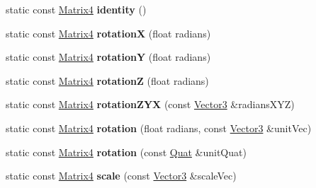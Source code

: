 \begin{DoxyCompactItemize}
static const \hyperlink{classVectormath_1_1Aos_1_1Matrix4}{Matrix4} {\bfseries identity} ()
\item 
\mbox{\label{classVectormath_1_1Aos_1_1Matrix4_a5727665fe6a8f581e578c9ca268da7f1}} 
static const \hyperlink{classVectormath_1_1Aos_1_1Matrix4}{Matrix4} {\bfseries rotationX} (float radians)
\item 
\mbox{\label{classVectormath_1_1Aos_1_1Matrix4_a083cd75aa544d7760d85a989da2d1211}} 
static const \hyperlink{classVectormath_1_1Aos_1_1Matrix4}{Matrix4} {\bfseries rotationY} (float radians)
\item 
\mbox{\label{classVectormath_1_1Aos_1_1Matrix4_a1f6d2e00f90838b9c79616f0ef13de66}} 
static const \hyperlink{classVectormath_1_1Aos_1_1Matrix4}{Matrix4} {\bfseries rotationZ} (float radians)
\item 
\mbox{\label{classVectormath_1_1Aos_1_1Matrix4_a0fa706fbac8a449fb7e51c6af85a240d}} 
static const \hyperlink{classVectormath_1_1Aos_1_1Matrix4}{Matrix4} {\bfseries rotation\+Z\+YX} (const \hyperlink{classVectormath_1_1Aos_1_1Vector3}{Vector3} \&radians\+X\+YZ)
\item 
\mbox{\label{classVectormath_1_1Aos_1_1Matrix4_a37eb7d5d9358402ee285aecd6895e381}} 
static const \hyperlink{classVectormath_1_1Aos_1_1Matrix4}{Matrix4} {\bfseries rotation} (float radians, const \hyperlink{classVectormath_1_1Aos_1_1Vector3}{Vector3} \&unit\+Vec)
\item 
\mbox{\label{classVectormath_1_1Aos_1_1Matrix4_a44fb8c241db203bee3a5d850af982eaa}} 
static const \hyperlink{classVectormath_1_1Aos_1_1Matrix4}{Matrix4} {\bfseries rotation} (const \hyperlink{classVectormath_1_1Aos_1_1Quat}{Quat} \&unit\+Quat)
\item 
\mbox{\label{classVectormath_1_1Aos_1_1Matrix4_abcf4dbea12c6c6b3db4e4812afa6fdab}} 
static const \hyperlink{classVectormath_1_1Aos_1_1Matrix4}{Matrix4} {\bfseries scale} (const \hyperlink{classVectormath_1_1Aos_1_1Vector3}{Vector3} \&scale\+Vec)
\item 

\end{DoxyCompactItemize}
